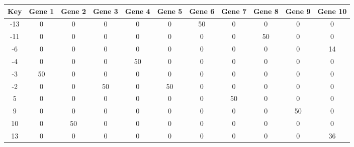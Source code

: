 \begin{tabular}{|c|c|c|c|c|c|c|c|c|c|c|}
\hline
Key & Gene 1 & Gene 2 & Gene 3 & Gene 4 & Gene 5 & Gene 6 & Gene 7 & Gene 8 & Gene 9 & Gene 10 \\
\hline
-13 & 0 & 0 & 0 & 0 & 0 & 50 & 0 & 0 & 0 & 0 \\
-11 & 0 & 0 & 0 & 0 & 0 & 0 & 0 & 50 & 0 & 0 \\
-6 & 0 & 0 & 0 & 0 & 0 & 0 & 0 & 0 & 0 & 14 \\
-4 & 0 & 0 & 0 & 50 & 0 & 0 & 0 & 0 & 0 & 0 \\
-3 & 50 & 0 & 0 & 0 & 0 & 0 & 0 & 0 & 0 & 0 \\
-2 & 0 & 0 & 50 & 0 & 50 & 0 & 0 & 0 & 0 & 0 \\
5 & 0 & 0 & 0 & 0 & 0 & 0 & 50 & 0 & 0 & 0 \\
9 & 0 & 0 & 0 & 0 & 0 & 0 & 0 & 0 & 50 & 0 \\
10 & 0 & 50 & 0 & 0 & 0 & 0 & 0 & 0 & 0 & 0 \\
13 & 0 & 0 & 0 & 0 & 0 & 0 & 0 & 0 & 0 & 36 \\
\hline
\end{tabular}